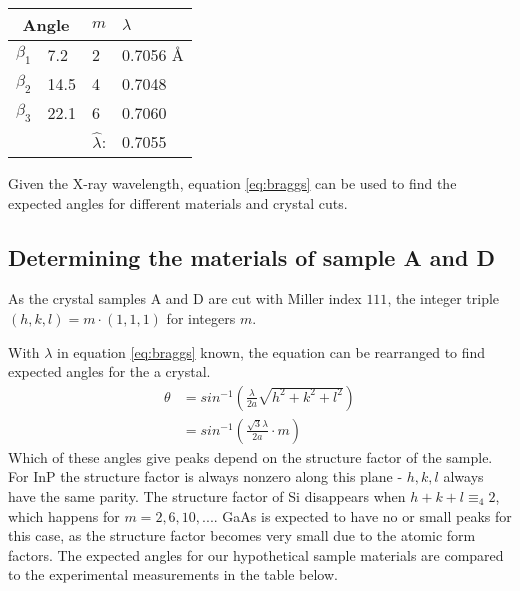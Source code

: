 \documentclass[a4paper,twoside=false,abstract=false,numbers=noenddot,
titlepage=false,headings=small,parskip=half,version=last]{scrartcl}
\begin{document}
\begin{tabular}{ |l|l|l|l| }
    \hline
    \multicolumn{2}{|c|}{Angle}& $m$ & $\lambda$\\
    \hline
    $\beta_1$	& 7.2\degree	& 2	& 0.7056 Å	\\
    $\beta_2$	& 14.5\degree	& 4	& 0.7048	\\
    $\beta_3$	& 22.1\degree	& 6	& 0.7060	\\
	\hline
	\multicolumn{3}{r|}{$\hat{\lambda}$:}	& 0.7055	\\
    \cline{4-4}
\end{tabular}

Given the X-ray wavelength, equation \eqref{eq:braggs} can be used to find the expected angles for different materials and crystal cuts.

\subsection{Determining the materials of sample A and D}

As the crystal samples A and D are cut with Miller index $111$,
the integer triple $(h,k,l)=m\cdot (1,1,1)$ for integers $m$.

With $\lambda$ in equation \eqref{eq:braggs} known, the equation can be rearranged to find expected angles for the a crystal.
\begin{align}
\label{eq:braggangle}
\theta&=sin^{-1}\left( \frac{\lambda}{2a} \sqrt{h^2+k^2+l^2}\right)\\
&=sin^{-1}\left( \frac{\sqrt{3}\lambda}{2a} \cdot m\right)\nonumber
\end{align}
Which of these angles give peaks depend on the structure factor of the sample.
For InP the structure factor is always nonzero along this plane - $h,k,l$ always have the same parity.
The structure factor of Si disappears when $h+k+l\equiv_4 2$, which happens for $m=2,6,10,...$.
GaAs is expected to have no or small peaks for this case, as the structure factor becomes very small due to the atomic form factors.
The expected angles for our hypothetical sample materials are compared to the experimental measurements in the table below.
\end{document}

